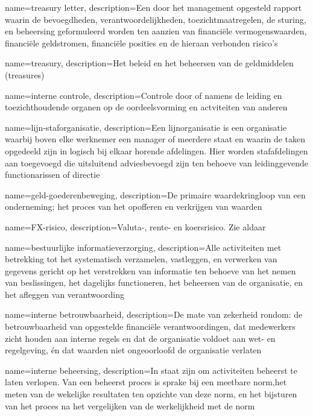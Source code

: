 
\makeglossaries

{
    name=treasury letter,
    description={Een door het management opgesteld rapport waarin de bevoegdheden, verantwoordelijkheden, toezichtmaatregelen, de sturing, en beheersing geformuleerd worden ten aanzien van financiële vermogenswaarden, financiële geldstromen, financiële posities en de hieraan verbonden risico’s}
}

{
    name=treasury,
    description={Het beleid en het beheersen van de geldmiddelen (treasures)}
}

{
    name=interne controle,
    description={Controle door of namens de leiding en toezichthoudende organen op de oordeelsvorming en actviteiten van anderen}
}

{
    name=lijn-staforganisatie,
    description={Een lijnorganisatie is een organisatie waarbij boven elke werknemer een manager of meerdere staat en waarin de taken opgedeeld zijn in logisch bij elkaar horende afdelingen. Hier worden stafafdelingen aan toegevoegd die uitsluitend adviesbevoegd zijn ten behoeve van leidinggevende functionarissen of directie}
}

{
    name=geld-goederenbeweging,
    description={De primaire waardekringloop van een onderneming; het proces van het opofferen en verkrijgen van waarden}
}

{
    name=FX-risico,
    description={Valuta-, rente- en koersrisico. Zie aldaar}
}

{
    name=bestuurlijke informatieverzorging,
    description={Alle activiteiten met betrekking tot het systematisch verzamelen, vastleggen, en verwerken van gegevens gericht op het verstrekken van informatie ten behoeve van het nemen van beslissingen, het dagelijks functioneren, het beheersen van de organisatie, en het afleggen van verantwoording}
}

{
    name=interne betrouwbaarheid,
    description={De mate van zekerheid rondom: de betrouwbaarheid van opgestelde financiële verantwoordingen, dat medewerkers zicht houden aan interne regels en dat de organisatie voldoet aan wet- en regelgeving, én dat waarden niet ongeoorloofd de organisatie verlaten}
}

{
    name=interne beheersing,
    description={In staat zijn om activiteiten beheerst te laten verlopen. Van een beheerst proces is sprake bij een meetbare norm,het meten van de wekelijke resultaten ten opzichte van deze norm, en het bijsturen van het proces na het vergelijken van de werkelijkheid met de norm}
}

